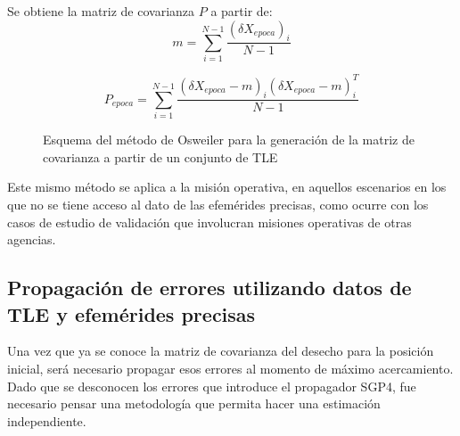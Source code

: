 Se obtiene la matriz de covarianza $P$ a partir de:\\

\begin{equation}
 m=\sum_{i=1}^{N-1} \frac{(\delta X_{epoca})_{i}}{N-1} 
\end{equation}

\begin{equation}
 P_{epoca}=\sum_{i=1}^{N-1} \frac{(\delta X_{epoca}-m)_{i}(\delta X_{epoca}-m)_{i}^{T}}{N-1}
\end{equation}

\begin{figure}[!h]
\centering
{}
\caption[M\'etodo de Osweiler, \citep{osweiler} para la generaci\'on de la matriz de covarianza]{Esquema del m\'etodo de Osweiler \citep{osweiler} para la generaci\'on de la matriz de covarianza a partir de un conjunto de TLE}
\label{fig:tleosw}
\end{figure}

Este mismo m\'etodo se aplica a la misi\'on operativa, en aquellos escenarios en los que no se tiene acceso al dato de las efem\'erides precisas, como ocurre con los casos de estudio de validaci\'on que involucran misiones operativas de otras agencias.\\

\subsection{Propagaci\'on de errores utilizando datos de TLE y efem\'erides precisas}\label{subsec:tablaprop}
Una vez que ya se conoce la matriz de covarianza del desecho para la posici\'on inicial, ser\'a necesario propagar esos errores al momento de m\'aximo acercamiento.
Dado que se desconocen los errores que introduce el propagador SGP4, fue necesario pensar una metodolog\'ia que permita hacer una estimaci\'on independiente.\\

